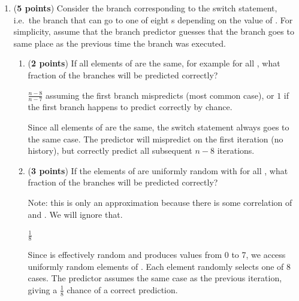 \documentclass{article}
\newenvironment{answer}
{\par\color{blue}}
{\normalfont\par}
\begin{document}
\begin{enumerate}
\begin{enumerate}
              \item (\textbf{5 points})
                    Consider the branch corresponding to the switch statement, i.e.\ the branch
                    that can go to one of eight s depending on the value of
                    .  For simplicity, assume that the branch predictor
                    guesses that the branch goes to same place as the previous time the branch was executed.
                    \begin{enumerate}
                        \item (\textbf{2 points}) If all elements of  are the same,
                              for example  for all , what fraction of the
                               branches will be predicted correctly?
                              \begin{answer}
                                  $\frac{n-8}{n-7}$ assuming the first branch mispredicts (most common case), or $1$ if the first branch happens to predict correctly by chance.

                                  Since all elements of  are the same, the switch statement always goes to the same case. The predictor will mispredict on the first iteration (no history), but correctly predict all subsequent $n-8$ iterations.
                              \end{answer}
                        \item (\textbf{3 points}) If the elements of  are uniformly random with
                               for all , what fraction of the
                               branches will be predicted correctly?
                              \par
                              Note: this is only an approximation because there is some correlation of
                               and .  We will ignore that.
                              \begin{answer}
                                  $\frac{1}{8}$

                                  Since  is effectively random and  produces values from 0 to 7, we access uniformly random elements of . Each element randomly selects one of 8 cases. The predictor assumes the same case as the previous iteration, giving a $\frac{1}{8}$ chance of a correct prediction.
                              \end{answer}
                    \end{enumerate}


\end{enumerate}
\end{enumerate}
\end{document}
